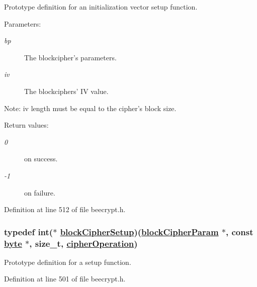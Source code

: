 Prototype definition for an initialization vector setup function. 

\begin{Desc}
\item[Parameters:]
\begin{description}
\item[{\em bp}]The blockcipher's parameters. \item[{\em iv}]The blockciphers' IV value. \end{description}
\end{Desc}
\begin{Desc}
\item[Note:]iv length must be equal to the cipher's block size. \end{Desc}
\begin{Desc}
\item[Return values:]
\begin{description}
\item[{\em 0}]on success. \item[{\em -1}]on failure. \end{description}
\end{Desc}
Definition at line 512 of file beecrypt.h.\hypertarget{group__BC__m_ga0}{
\subsubsection[blockCipherSetup]{\setlength{\rightskip}{0pt plus 5cm}typedef int($\ast$ \hyperlink{group__BC__m_ga0}{block\-Cipher\-Setup})(\hyperlink{group__BC__m_ga1}{block\-Cipher\-Param} $\ast$, const \hyperlink{beecrypt_8api_8h_a3}{byte} $\ast$, size\_\-t, \hyperlink{beecrypt_8h_a73}{cipher\-Operation})}}
\label{group__BC__m_ga0}


Prototype definition for a setup function. 

Definition at line 501 of file beecrypt.h.
